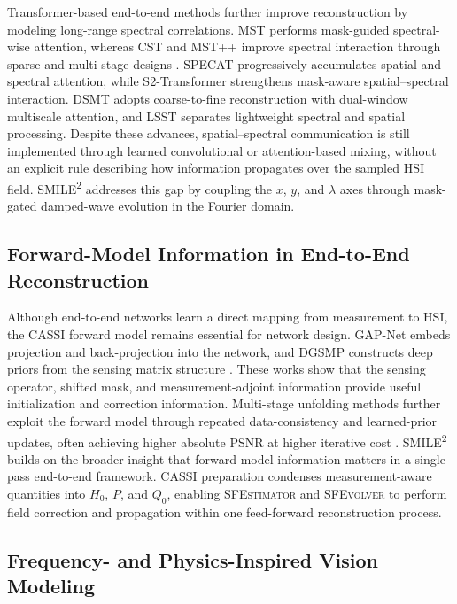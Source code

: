 \documentclass[letterpaper]{article} %
\newcommand{\smiletwo}{SMILE\textsuperscript{2}}
\newcommand{\sfestimator}{\textsc{SFEstimator}}
\newcommand{\sfevolver}{\textsc{SFEvolver}}
\begin{document}
Transformer-based end-to-end methods further improve reconstruction by modeling long-range spectral correlations.
MST performs mask-guided spectral-wise attention, whereas CST and MST++ improve spectral interaction through sparse and multi-stage designs \cite{cai2022mst,cai2022cst,cai2022mstpp}.
SPECAT \cite{yao2024specat} progressively accumulates spatial and spectral attention, while S2-Transformer \cite{wang2025s2transformer} strengthens mask-aware spatial--spectral interaction.
DSMT \cite{luo2025dsmt} adopts coarse-to-fine reconstruction with dual-window multiscale attention, and LSST \cite{li2026lsst} separates lightweight spectral and spatial processing.
Despite these advances, spatial--spectral communication is still implemented through learned convolutional or attention-based mixing, without an explicit rule describing how information propagates over the sampled HSI field.
\smiletwo{} addresses this gap by coupling the \(x\), \(y\), and \(\lambda\) axes through mask-gated damped-wave evolution in the Fourier domain.

\subsection{Forward-Model Information in End-to-End Reconstruction}

Although end-to-end networks learn a direct mapping from measurement to HSI, the CASSI forward model remains essential for network design.
GAP-Net embeds projection and back-projection into the network, and DGSMP constructs deep priors from the sensing matrix structure \cite{meng2020gapnet,huang2021dgsmp}.
These works show that the sensing operator, shifted mask, and measurement-adjoint information provide useful initialization and correction information.
Multi-stage unfolding methods further exploit the forward model through repeated data-consistency and learned-prior updates, often achieving higher absolute PSNR at higher iterative cost \cite{cai2022dauhst,zhang2024dpu,zhang2024ssr}.
\smiletwo{} builds on the broader insight that forward-model information matters in a single-pass end-to-end framework. CASSI preparation condenses measurement-aware quantities into \(H_0\), \(P\), and \(Q_0\), enabling \sfestimator{} and \sfevolver{} to perform field correction and propagation within one feed-forward reconstruction process.

\subsection{Frequency- and Physics-Inspired Vision Modeling}
\end{document}
